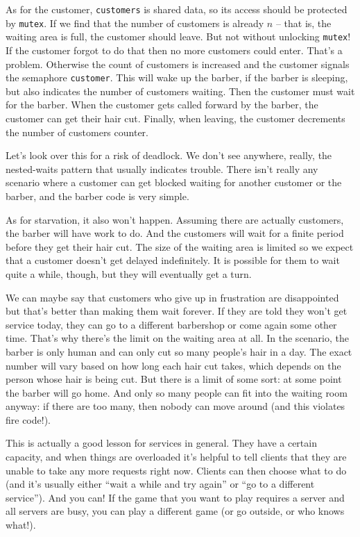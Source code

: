 As for the customer, \texttt{customers} is shared data, so its access should be protected by \texttt{mutex}. If we find that the number of customers is already $n$ -- that is, the waiting area is full, the customer should leave. But not without unlocking \texttt{mutex}! If the customer forgot to do that then no more customers could enter. That's a problem. Otherwise the count of customers is increased and the customer signals the semaphore \texttt{customer}. This will wake up the barber, if the barber is sleeping, but also indicates the number of customers waiting. Then the customer must wait for the barber. When the customer gets called forward by the barber, the customer can get their hair cut. Finally, when leaving, the customer decrements the number of customers counter.

Let's look over this for a risk of deadlock. We don't see anywhere, really, the nested-waits pattern that usually indicates trouble. There isn't really any scenario where a customer can get blocked waiting for another customer or the barber, and the barber code is very simple.

As for starvation, it also won't happen. Assuming there are actually customers, the barber will have work to do. And the customers will wait for a finite period before they get their hair cut. The size of the waiting area is limited so we expect that a customer doesn't get delayed indefinitely. It is possible for them to wait quite a while, though, but they will eventually get a turn.

We can maybe say that customers who give up in frustration are disappointed but that's better than making them wait forever. If they are told they won't get service today, they can go to a different barbershop or come again some other time. That's why there's the limit on the waiting area at all. In the scenario, the barber is only human and can only cut so many people's hair in a day. The exact number will vary based on how long each hair cut takes, which depends on the person whose hair is being cut. But there is a limit of some sort: at some point the barber will go home. And only so many people can fit into the waiting room anyway: if there are too many, then nobody can move around (and this violates fire code!).

This is actually a good lesson for services in general. They have a certain capacity, and when things are overloaded it's helpful to tell clients that they are unable to take any more requests right now. Clients can then choose what to do (and it's usually either ``wait a while and try again'' or ``go to a different service''). And you can! If the game that you want to play requires a server and all servers are busy, you can play a different game (or go outside, or who knows what!).


